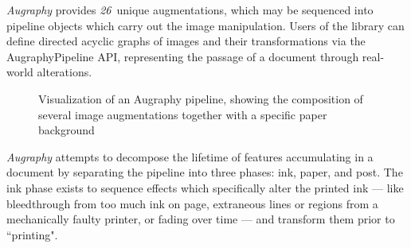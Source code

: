 \documentclass[runningheads]{llncs}
\newcommand{\numAugraphyAugmentations}{\emph{26}}
\begin{document}
\emph{Augraphy} provides \numAugraphyAugmentations ~unique augmentations, which may be sequenced into pipeline objects which carry out the image manipulation.
Users of the library can define directed acyclic graphs of images and their transformations via the AugraphyPipeline API, representing the passage of a document through real-world alterations.
\begin{figure}
\centering
{}
\caption{Visualization of an Augraphy pipeline, showing the composition of several image augmentations together with a specific paper background} \label{fig:pipeline}
\end{figure}

\emph{Augraphy} attempts to decompose the lifetime of features accumulating in a document by separating the pipeline into three phases: ink, paper, and post.
The ink phase exists to sequence effects which specifically alter the printed ink --- like bleedthrough from too much ink on page, extraneous lines or regions from a mechanically faulty printer, or fading over time --- and transform them prior to ``printing".
\end{document}
